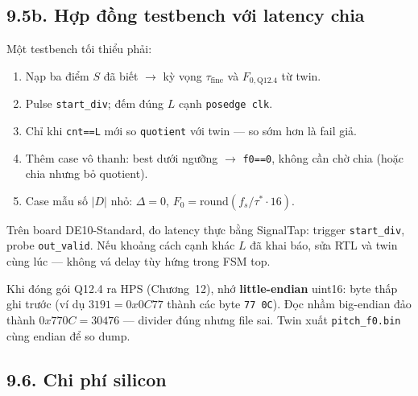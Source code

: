 \subsection*{9.5b. Hợp đồng testbench với latency chia}

Một testbench tối thiểu phải:

\begin{enumerate}[leftmargin=1.4em]
\item Nạp ba điểm $S$ đã biết $\to$ kỳ vọng $\tau_{\mathrm{fine}}$ và $F_{0,\mathrm{Q12.4}}$ từ twin.
\item Pulse \texttt{start\_div}; đếm đúng $L$ cạnh \texttt{posedge clk}.
\item Chỉ khi \texttt{cnt==L} mới so \texttt{quotient} với twin --- so sớm hơn là fail giả.
\item Thêm case vô thanh: best dưới ngưỡng $\to$ \texttt{f0==0}, không cần chờ chia (hoặc chia nhưng bỏ quotient).
\item Case mẫu số $|D|$ nhỏ: $\Delta=0$, $F_0=\mathrm{round}(f_s/\tau^*\cdot 16)$.
\end{enumerate}

Trên board DE10-Standard, đo latency thực bằng SignalTap: trigger \texttt{start\_div}, probe \texttt{out\_valid}.
Nếu khoảng cách cạnh khác $L$ đã khai báo, sửa RTL và twin cùng lúc --- không vá delay tùy hứng trong FSM top.

Khi đóng gói Q12.4 ra HPS (Chương~12), nhớ \textbf{little-endian} uint16: byte thấp ghi trước
(ví dụ $3191=0x0C77$ thành các byte \texttt{77 0C}).
Đọc nhầm big-endian đảo thành $0x770C=30476$ --- divider đúng nhưng file sai.
Twin xuất \texttt{pitch\_f0.bin} cùng endian để so dump.

\subsection*{9.6. Chi phí silicon}

